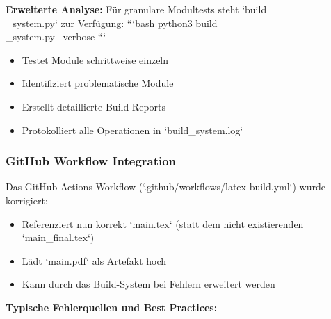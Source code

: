 \textbf{Erweiterte Analyse:}
Für granulare Modultests steht `build\\_system.py` zur Verfügung:
```bash
python3 build\\_system.py --verbose
```
\begin{itemize}
\item Testet Module schrittweise einzeln
\item Identifiziert problematische Module
\item Erstellt detaillierte Build-Reports
\item Protokolliert alle Operationen in `build\_system.log`
\end{itemize}

\subsubsection{GitHub Workflow Integration}

Das GitHub Actions Workflow (`.github/workflows/latex-build.yml`) wurde korrigiert:
\begin{itemize}
\item Referenziert nun korrekt `main.tex` (statt dem nicht existierenden `main\_final.tex`)
\item Lädt `main.pdf` als Artefakt hoch
\item Kann durch das Build-System bei Fehlern erweitert werden
\end{itemize}

\textbf{Typische Fehlerquellen und Best Practices:}

